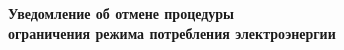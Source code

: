 \vspace{5mm}
\begin{center}
	\Large\textbf{Уведомление об отмене процедуры\\ 
		ограничения режима потребления электроэнергии}
\end{center}
\par
\vspace{5mm}





